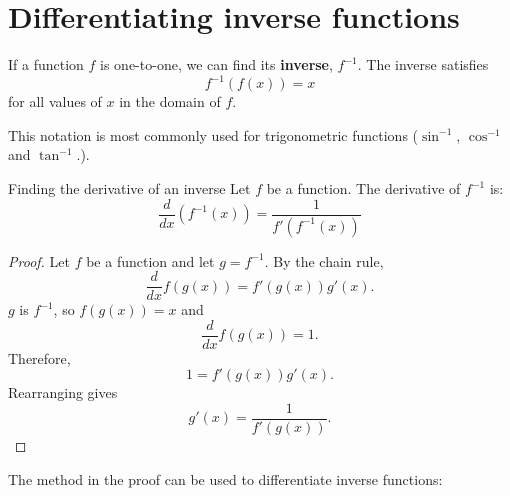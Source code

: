 \section{Differentiating inverse functions}

\begin{definition}
If a function $f$ is one-to-one, we can find its \textbf{inverse}, $f^{-1}$. The inverse satisfies $$f^{-1}(f(x))=x$$ for all values of $x$ in the domain of $f$.
\end{definition}

This notation is most commonly used for trigonometric functions ($\sin^{-1}$, $\cos^{-1}$ and $\tan^{-1}$.).



\begin{thing}{Finding the derivative of an inverse}
Let $f$ be a function. The derivative of $f^{-1}$ is:
$$\frac{d}{dx}\left(f^{-1}(x)\right)=\frac{1}{f'(f^{-1}(x))}$$
\begin{proof}
Let $f$ be a function and let $g=f^{-1}$. By the chain rule,
$$\frac{d}{dx} f(g(x)) = f'(g(x))g'(x).$$
$g$ is $f^{-1}$, so $f(g(x))=x$ and $$\frac{d}{dx} f(g(x)) = 1.$$
Therefore, $$1 = f'(g(x))g'(x).$$ Rearranging gives $$g'(x)=\frac{1}{f'(g(x))}.$$
\end{proof}
\end{thing}

The method in the proof can be used to differentiate inverse functions:

